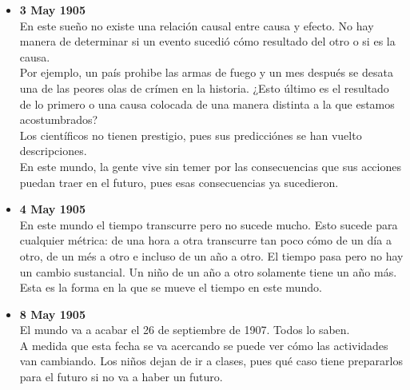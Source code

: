 \documentclass[12pt,a4paper]{report}
\begin{document}
\begin{itemize}
{\begin{itemize}[label=$\bullet$]
{            unos instantes para adorar la perfección del tiempo y sincronizar
            sus relojes.\\
            Los religiosos incluso argumentan que la misma perfección del tiempo
            es prueba de existencia de lo divino.\\
            Lo que es cierto es que la gente se refugia en su perfección, pues
            en un mundo en el que las cosas pueden salir mal o de manera
            inesperada, la gente sabe que se puede refugiar en la perfección del
            tiempo, que es universal para todos.
        }
        \item{\textbf{3 May 1905}\\
            En este sueño no existe una relación causal entre causa y efecto. No
            hay manera de determinar si un evento sucedió cómo resultado del
            otro o si es la causa.\\
            Por ejemplo, un país prohibe las armas de fuego y un mes después se
            desata una de las peores olas de crímen en la historia. ¿Esto
            último es el resultado de lo primero o una causa colocada de una
            manera distinta a la que estamos acostumbrados?\\
            Los científicos no tienen prestigio, pues sus predicciónes se han
            vuelto descripciones. \\
            En este mundo, la gente vive sin temer por las consecuencias que sus
            acciones puedan traer en el futuro, pues esas consecuencias ya
            sucedieron.
        }
        \item{\textbf{4 May 1905}\\
            En este mundo el tiempo transcurre pero no sucede mucho. Esto sucede
            para cualquier métrica: de una hora a otra transcurre tan poco cómo
            de un día a otro, de un més a otro e incluso de un año a otro. El
            tiempo pasa pero no hay un cambio sustancial. Un niño de un año a
            otro solamente tiene un año más. Esta es la forma en la que se mueve
            el tiempo en este mundo.
        }
        \item{\textbf{8 May 1905}\\
            El mundo va a acabar el 26 de septiembre de 1907. Todos lo saben.\\
            A medida que esta fecha se va acercando se puede ver cómo las
            actividades van cambiando. Los niños dejan de ir a clases, pues qué
            caso tiene prepararlos para el futuro si no va a haber un futuro.
}
\end{itemize}}
\end{itemize}
\end{document}
